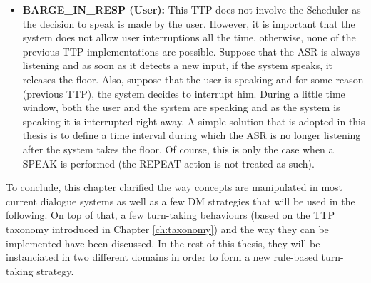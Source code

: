 \begin{itemize}
     \item \textbf{BARGE\_IN\_RESP (User):} This TTP does not involve the Scheduler as the decision to speak is made by the user. However, it is important that the system does not allow user interruptions all the time, otherwise, none of the previous TTP implementations are possible. Suppose that the ASR is always listening and as soon as it detects a new input, if the system speaks, it releases the floor. Also, suppose that the user is speaking and for some reason (previous TTP), the system decides to interrupt him. During a little time window, both the user and the system are speaking and as the system is speaking it is interrupted right away. A simple solution that is adopted in this thesis is to define a time interval during which the ASR is no longer listening after the system takes the floor. Of course, this is only the case when a SPEAK is performed (the REPEAT action is not treated as such).
     \end{itemize}

     To conclude, this chapter clarified the way concepts are manipulated in most current dialogue systems as well as a few DM strategies that will be used in the following. On top of that, a few turn-taking behaviours (based on the TTP taxonomy introduced in Chapter \ref{ch:taxonomy}) and the way they can be implemented have been discussed. In the rest of this thesis, they will be instanciated in two different domains in order to form a new rule-based turn-taking strategy.
